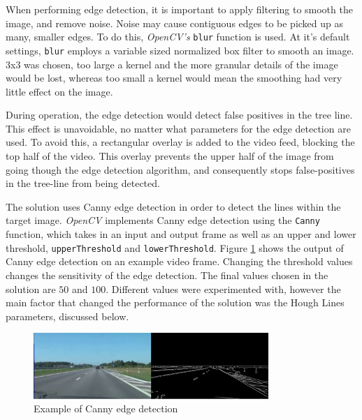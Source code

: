 \documentclass[conference]{IEEEtran}
\begin{document}
When performing edge detection, it is important to apply filtering to smooth the image, and remove noise. Noise may cause contiguous edges to be picked up as many, smaller edges.  To do this, \textit{OpenCV's} \verb|blur| function is used. At it's default settings, \verb|blur| employs a variable sized normalized box filter to smooth an image\cite{BlurDocs}. $3$x$3$ was chosen, too large a kernel and the more granular details of the image would be lost, whereas too small a kernel would mean the smoothing had very little effect on the image.

During operation, the edge detection would detect false positives in the tree line. This effect is unavoidable, no matter what parameters for the edge detection are used. To avoid this, a rectangular overlay is added to the video feed, blocking the top half of the video. This overlay prevents the upper half of the image from going though the edge detection algorithm, and consequently stops false-positives in the tree-line from being detected.

The solution uses Canny edge detection in order to detect the lines within the target image. \textit{OpenCV} implements Canny edge detection using the \verb|Canny| function\cite{8265710}, which takes in an input and output frame as well as an upper and lower threshold, \verb|upperThreshold| and \verb|lowerThreshold|. Figure \ref{fig:Canny} shows the output of Canny edge detection on an example video frame. Changing the threshold values changes the sensitivity of the edge detection. The final values chosen in the solution are $50$ and $100$. Different values were experimented with, however the main factor that changed the performance of the solution was the Hough Lines parameters, discussed below. 

\begin{figure}[H]
\centering
\includegraphics[width=3.5in]{t5_edge}
\caption{Example of Canny edge detection}
\label{fig:Canny}
\end{figure}
 
\end{document}
